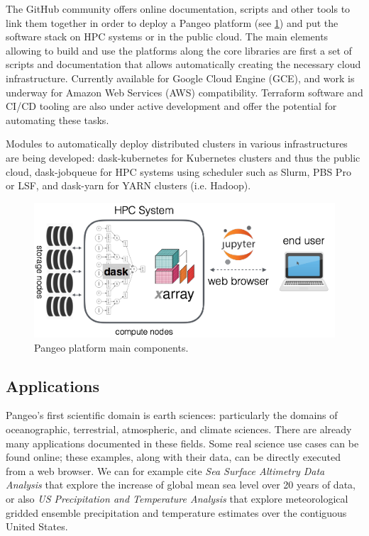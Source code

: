 \documentclass{article}
\begin{document}
The GitHub community offers online documentation, scripts and other tools to link them together in order to deploy a Pangeo platform (see \ref{pangeo_stack}) and put the software stack on HPC systems or in the public cloud. The main elements allowing to build and use the platforms along the core libraries are first a set of scripts and documentation that allows automatically creating the necessary cloud infrastructure. Currently available for Google Cloud Engine (GCE), and work is underway for Amazon Web Services (AWS) compatibility. Terraform software and CI/CD tooling are also under active development and offer the potential for automating these tasks.

Modules to automatically deploy distributed clusters in various infrastructures are being developed: dask-kubernetes for Kubernetes clusters and thus the public cloud, dask-jobqueue\cite{b4} for HPC systems using scheduler such as Slurm, PBS Pro or LSF, and dask-yarn for YARN clusters (i.e. Hadoop).

\begin{figure}
  \centering
  \includegraphics[width=\columnwidth]{pangeo_stack.png}
  \caption{\label{pangeo_stack} Pangeo platform main components.}
\end{figure}

\subsection{Applications}
\label{ssec:applications}

Pangeo's first scientific domain is earth sciences: particularly the domains of oceanographic, terrestrial, atmospheric, and climate sciences. There are already many applications documented in these fields. Some real science use cases can be found online\cite{b5}; these examples, along with their data, can be directly executed from a web browser. We can for example cite \textit{Sea Surface Altimetry Data Analysis} that explore the increase of global mean sea level over 20 years of data, or also \textit{US Precipitation and Temperature Analysis} that explore meteorological gridded ensemble precipitation and temperature estimates over the contiguous United States.
\end{document}

